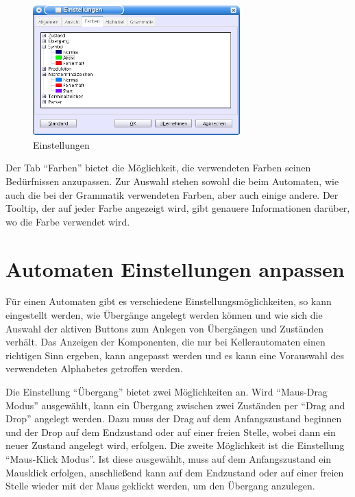 \begin{figure}[h]
\begin{center}
\includegraphics[width=8cm]{../images/preferences.png}
\caption{Einstellungen}
\end{center}
\end{figure}

Der Tab "`Farben"' bietet die Möglichkeit, die verwendeten Farben seinen
Be\-dürf\-nis\-sen anzupassen. Zur Auswahl stehen sowohl die beim Automaten, wie
auch die bei der Grammatik verwendeten Farben, aber auch einige andere. Der
Tooltip, der auf jeder Farbe angezeigt wird, gibt genauere Informationen
darüber, wo die Farbe verwendet wird.


\section{Automaten Einstellungen anpassen}

Für einen Automaten gibt es verschiedene Einstellungsmöglichkeiten, so kann
eingestellt werden, wie Übergänge angelegt werden können und wie sich die
Auswahl der aktiven Buttons zum Anlegen von Übergängen und Zuständen verhält.
Das Anzeigen der Komponenten, die nur bei Kellerautomaten einen richtigen Sinn
ergeben, kann angepasst werden und es kann eine Vorauswahl des verwendeten
Alphabetes getroffen werden.\vspace{10pt}

Die Einstellung "`Übergang"' bietet zwei Möglichkeiten an. Wird "`Maus-Drag Modus"'
ausgewählt, kann ein Übergang zwischen zwei Zuständen per "`Drag and Drop"' angelegt
werden. Dazu muss der Drag auf dem Anfangszustand beginnen und der Drop auf dem
Endzustand oder auf einer freien Stelle, wobei dann ein neuer Zustand angelegt wird,
erfolgen. Die zweite Möglichkeit ist die Einstellung "`Maus-Klick Modus"'. Ist
diese ausgewählt, muss auf dem Anfangszustand ein Mausklick erfolgen,
anschließend kann auf dem Endzustand oder auf einer freien Stelle wieder mit
der Maus geklickt werden, um den Übergang anzulegen.\vspace{10pt}

